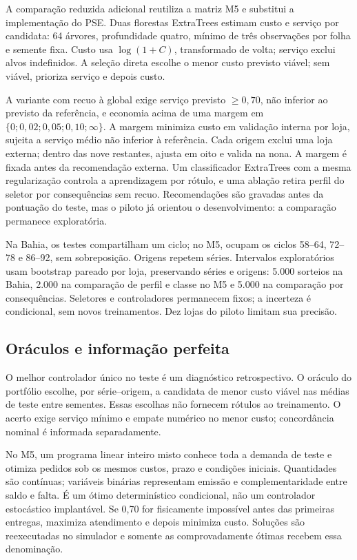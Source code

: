 \documentclass[preprint,12pt]{elsarticle}
\begin{document}
A comparação reduzida adicional reutiliza a matriz M5 e substitui a implementação do PSE. Duas florestas ExtraTrees estimam custo e serviço por candidata: 64 árvores, profundidade quatro, mínimo de três observações por folha e semente fixa. Custo usa $\log(1+C)$, transformado de volta; serviço exclui alvos indefinidos. A seleção direta escolhe o menor custo previsto viável; sem viável, prioriza serviço e depois custo.

A variante com recuo à global exige serviço previsto $\geq0{,}70$, não inferior ao previsto da referência, e economia acima de uma margem em $\{0;0{,}02;0{,}05;0{,}10;\infty\}$. A margem minimiza custo em validação interna por loja, sujeita a serviço médio não inferior à referência. Cada origem exclui uma loja externa; dentro das nove restantes, ajusta em oito e valida na nona. A margem é fixada antes da recomendação externa. Um classificador ExtraTrees com a mesma regularização controla a aprendizagem por rótulo, e uma ablação retira perfil do seletor por consequências sem recuo. Recomendações são gravadas antes da pontuação do teste, mas o piloto já orientou o desenvolvimento: a comparação permanece exploratória.

Na Bahia, os testes compartilham um ciclo; no M5, ocupam os ciclos 58--64, 72--78 e 86--92, sem sobreposição. Origens repetem séries. Intervalos exploratórios usam bootstrap pareado por loja, preservando séries e origens: 5.000 sorteios na Bahia, 2.000 na comparação de perfil e classe no M5 e 5.000 na comparação por consequências. Seletores e controladores permanecem fixos; a incerteza é condicional, sem novos treinamentos. Dez lojas do piloto limitam sua precisão.

\subsection{Oráculos e informação perfeita}
O melhor controlador único no teste é um diagnóstico retrospectivo. O oráculo do portfólio escolhe, por série--origem, a candidata de menor custo viável nas médias de teste entre sementes. Essas escolhas não fornecem rótulos ao treinamento. O acerto exige serviço mínimo e empate numérico no menor custo; concordância nominal é informada separadamente.

No M5, um programa linear inteiro misto conhece toda a demanda de teste e otimiza pedidos sob os mesmos custos, prazo e condições iniciais. Quantidades são contínuas; variáveis binárias representam emissão e complementaridade entre saldo e falta. É um ótimo determinístico condicional, não um controlador estocástico implantável. Se 0,70 for fisicamente impossível antes das primeiras entregas, maximiza atendimento e depois minimiza custo. Soluções são reexecutadas no simulador e somente as comprovadamente ótimas recebem essa denominação.
\end{document}
